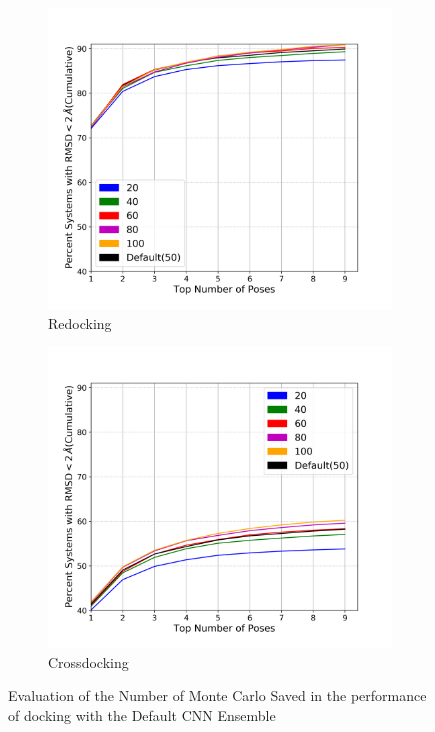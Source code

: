 \documentclass[journal=jcisd8,manuscript=article]{achemso}
\begin{document}
\begin{figure}    
        \begin{subfigure}[b]{0.48\textwidth}    
		\centering
		\includegraphics[width=\textwidth]{figures/redocking/sweep_mcsaved_line.png}
		\caption{Redocking}
		\label{fig:mcsaved rd}
        \end{subfigure}    
        \begin{subfigure}[b]{0.48\textwidth}    
		\centering
		\includegraphics[width=\textwidth]{figures/crossdocking/sweep_mcsaved_line.png}
		\caption{Crossdocking}
		\label{fig:mcsaved cd}
        \end{subfigure}    
	\caption{Evaluation of the Number of Monte Carlo Saved in the performance of docking with the Default CNN Ensemble}
	\label{fig:mcsaved}
\end{figure}    
\end{document}
